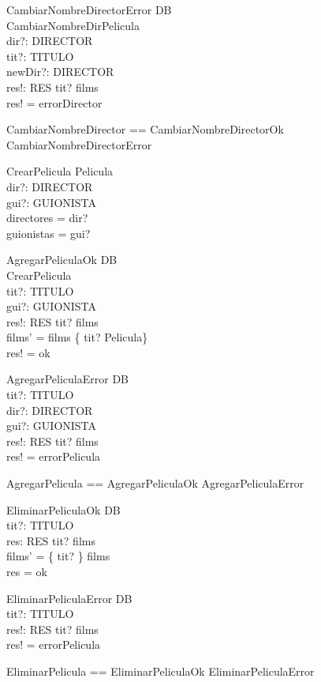 \documentclass[a4paper, 12pt] {article}
\begin{document}
\begin{schema}{CambiarNombreDirectorError}
\Xi DB \\
CambiarNombreDirPelicula \\
dir?: DIRECTOR \\
tit?: TITULO \\
newDir?: DIRECTOR \\
res!: RES
\where
tit? \notin \dom films \\
res! = errorDirector
\end{schema}

\begin{zed}
CambiarNombreDirector == CambiarNombreDirectorOk \lor CambiarNombreDirectorError
\end{zed}


\begin{schema}{CrearPelicula}
Pelicula \\
dir?: \power DIRECTOR \\
gui?: \power GUIONISTA \\
\where
directores = dir? \\
guionistas = gui?
\end{schema}

\begin{schema}{AgregarPeliculaOk}
\Delta DB \\
CrearPelicula \\
tit?: TITULO \\
gui?: \power GUIONISTA \\
res!: RES
\where
tit? \notin \dom films \\
films' = films \cup \{ tit? \mapsto \theta Pelicula\} \\
res! = ok
\end{schema}

\begin{schema}{AgregarPeliculaError}
\Xi DB \\
tit?: TITULO \\
dir?: \power DIRECTOR \\
gui?: \power GUIONISTA \\
res!: RES
\where
tit? \in \dom films \\
res! = errorPelicula
\end{schema}

\begin{zed}
AgregarPelicula == AgregarPeliculaOk \lor AgregarPeliculaError
\end{zed}

\begin{schema}{EliminarPeliculaOk}
\Delta DB \\
tit?: TITULO \\
res: RES
\where
tit? \in \dom films \\
films' = \{ tit? \} \ndres films \\
res = ok
\end{schema}

\begin{schema}{EliminarPeliculaError}
\Delta DB \\
tit?: TITULO \\
res!: RES
\where
tit? \notin \dom films \\
res! = errorPelicula
\end{schema}

\begin{zed}
EliminarPelicula == EliminarPeliculaOk \lor EliminarPeliculaError
\end{zed}
\end{document}
